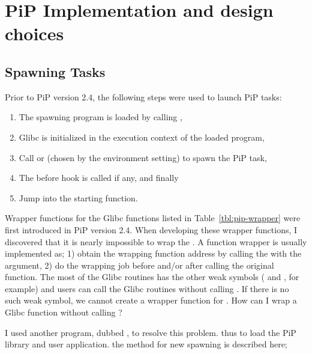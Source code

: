 
\section{PiP Implementation and design choices}

\subsection{Spawning Tasks}\label{sec:spawn-details}

Prior to PiP version 2.4, the following steps were used to launch PiP
tasks:

\begin{enumerate}
\item The spawning program is loaded by calling ,
\item Glibc is initialized in the execution context of the loaded
  program,
\item Call  or  (chosen
  by the  environment setting) to spawn the PiP task,
\item The before hook is called if any, and finally
\item Jump into the starting function.
\end{enumerate}

Wrapper functions for the Glibc functions listed in
Table~\ref{tbl:pip-wrapper} were first introduced in PiP version
2.4. When developing these wrapper functions, I discovered that it is
nearly impossible to wrap the .
A function wrapper is usually implemented as; 1) obtain the wrapping
function address by calling the  with the
argument, 2) do the wrapping job before and/or after calling the
original function. The most of the Glibc  routines has
the other weak symbols ( and
, for example) and users can call the Glibc
 routines without  
calling . If there is no such weak symbol, we cannot
create a wrapper function for . How can I
wrap a Glibc function without calling ?

I used another program, dubbed , to resolve this
problem. thus to load the PiP library and user application. the method
for new spawning is described here;


